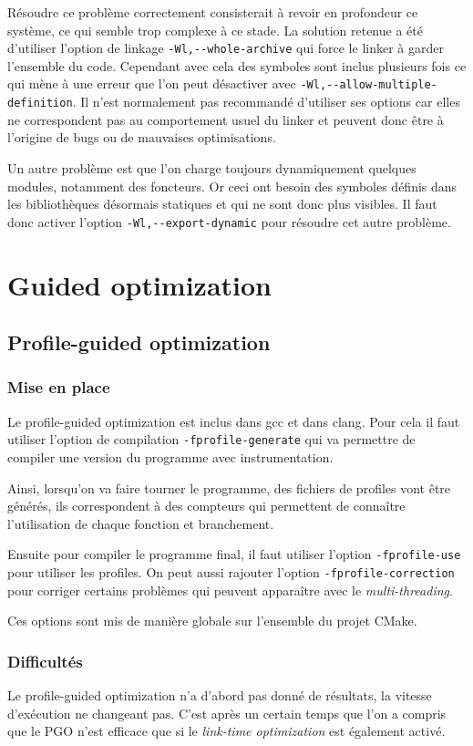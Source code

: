 \documentclass[a4paper]{report}
\begin{document}
Résoudre ce problème correctement consisterait à revoir en profondeur ce système, ce qui semble trop complexe à ce stade.
La solution retenue a été d'utiliser l'option de linkage \verb'-Wl,--whole-archive' qui force le linker à garder l'ensemble du code.
Cependant avec cela des symboles sont inclus plusieurs fois ce qui mène à une erreur que l'on peut désactiver avec \verb'-Wl,--allow-multiple-definition'.
Il n'est normalement pas recommandé d'utiliser ses options car elles ne correspondent pas au comportement usuel du linker et peuvent donc être à l'origine de bugs ou de mauvaises optimisations.

Un autre problème est que l'on charge toujours dynamiquement quelques modules, notamment des foncteurs.
Or ceci ont besoin des symboles définis dans les bibliothèques désormais statiques et qui ne sont donc plus visibles.
Il faut donc activer l'option \verb'-Wl,--export-dynamic' pour résoudre cet autre problème.


\section{Guided optimization}

\subsection{Profile-guided optimization}
\subsubsection{Mise en place}
Le profile-guided optimization est inclus dans gcc et dans clang.
Pour cela il faut utiliser l'option de compilation \verb'-fprofile-generate' qui va permettre de compiler une version du programme avec instrumentation.

Ainsi, lorsqu'on va faire tourner le programme, des fichiers de profiles vont être générés, ils correspondent à des compteurs qui permettent de connaître l'utilisation de chaque fonction et branchement.

Ensuite pour compiler le programme final, il faut utiliser l'option \verb'-fprofile-use' pour utiliser les profiles.
On peut aussi rajouter l'option \verb'-fprofile-correction' pour corriger certains problèmes qui peuvent apparaître avec le \emph{multi-threading}.

Ces options sont mis de manière globale sur l'ensemble du projet CMake.

\subsubsection{Difficultés}
Le profile-guided optimization n'a d'abord pas donné de résultats, la vitesse d'exécution ne changeant pas.
C'est après un certain temps que l'on a compris que le PGO n'est efficace que si le \emph{link-time optimization} est également activé.
\end{document}
